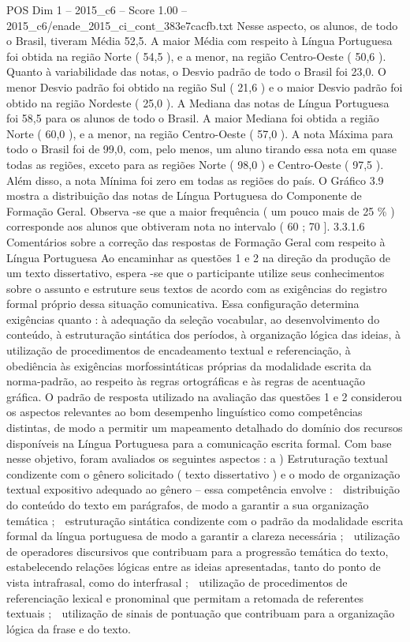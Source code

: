\begin{textsample}{POS Dim 1 – 2015\_c6 – Score 1.00 – 2015\_c6/enade\_2015\_ci\_cont\_383e7cacfb.txt}
Nesse aspecto, os alunos, de todo o Brasil, tiveram Média 52,5.
A maior Média com respeito à Língua Portuguesa foi obtida na região Norte ( 54,5 ), e a menor, na região Centro-Oeste ( 50,6 ).
Quanto à variabilidade das notas, o Desvio padrão de todo o Brasil foi 23,0.
O menor Desvio padrão foi obtido na região Sul ( 21,6 ) e o maior Desvio padrão foi obtido na região Nordeste ( 25,0 ).
A Mediana das notas de Língua Portuguesa foi 58,5 para os alunos de todo o Brasil.
A maior Mediana foi obtida a região Norte ( 60,0 ), e a menor, na região Centro-Oeste ( 57,0 ).
A nota Máxima para todo o Brasil foi de 99,0, com, pelo menos, um aluno tirando essa nota em quase todas as regiões, exceto para as regiões Norte ( 98,0 ) e Centro-Oeste ( 97,5 ).
Além disso, a nota Mínima foi zero em todas as regiões do país.
O Gráfico 3.9 mostra a distribuição das notas de Língua Portuguesa do Componente de Formação Geral.
Observa -se que a maior frequência ( um pouco mais de 25 \% ) corresponde aos alunos que obtiveram nota no intervalo ( 60 ; 70 ]. 3.3.1.6 Comentários sobre a correção das respostas de Formação Geral com respeito à Língua Portuguesa Ao encaminhar as questões 1 e 2 na direção da produção de um texto dissertativo, espera -se que o participante utilize seus conhecimentos sobre o assunto e estruture seus textos de acordo com as exigências do registro formal próprio dessa situação comunicativa.
Essa configuração determina exigências quanto : à adequação da seleção vocabular, ao desenvolvimento do conteúdo, à estruturação sintática dos períodos, à organização lógica das ideias, à utilização de procedimentos de encadeamento textual e referenciação, à obediência às exigências morfossintáticas próprias da modalidade escrita da norma-padrão, ao respeito às regras ortográficas e às regras de acentuação gráfica.
O padrão de resposta utilizado na avaliação das questões 1 e 2 considerou os aspectos relevantes ao bom desempenho linguístico como competências distintas, de modo a permitir um mapeamento detalhado do domínio dos recursos disponíveis na Língua Portuguesa para a comunicação escrita formal.
Com base nesse objetivo, foram avaliados os seguintes aspectos : a ) Estruturação textual condizente com o gênero solicitado ( texto dissertativo ) e o modo de organização textual expositivo adequado ao gênero – essa competência envolve :  distribuição do conteúdo do texto em parágrafos, de modo a garantir a sua organização temática ;  estruturação sintática condizente com o padrão da modalidade escrita formal da língua portuguesa de modo a garantir a clareza necessária ;  utilização de operadores discursivos que contribuam para a progressão temática do texto, estabelecendo relações lógicas entre as ideias apresentadas, tanto do ponto de vista intrafrasal, como do interfrasal ;  utilização de procedimentos de referenciação lexical e pronominal que permitam a retomada de referentes textuais ;  utilização de sinais de pontuação que contribuam para a organização lógica da frase e do texto.

\end{textsample}
